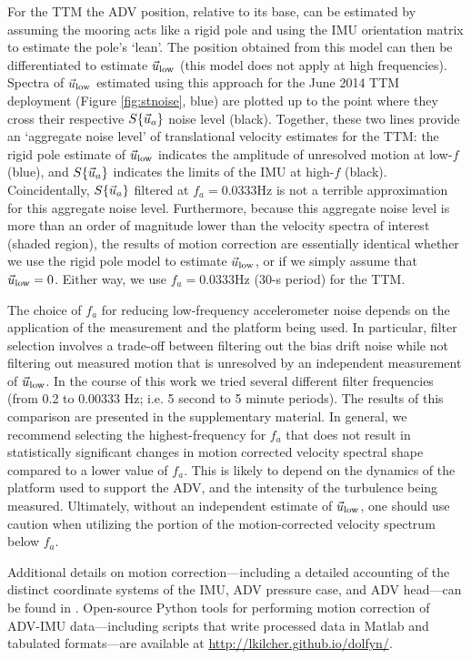 For the TTM the ADV position, relative to its base, can be estimated by assuming the mooring acts like a rigid pole and using the IMU orientation matrix to estimate the pole's `lean'. The position obtained from this model can then be differentiated to estimate $\ulow$ (this model does not apply at high frequencies). Spectra of $\ulow$ estimated using this approach for the June 2014 TTM deployment (Figure \ref{fig:stnoise}, blue) are plotted up to the point where they cross their respective $\spec{\uacc}$ noise level (black).  Together, these two lines provide an `aggregate noise level' of translational velocity estimates for the TTM: the rigid pole estimate of $\ulow$ indicates the amplitude of unresolved motion at low-$f$ (blue), and $\spec{\uacc}$ indicates the limits of the IMU at high-$f$ (black). Coincidentally, $\spec{\uacc}$ filtered at $f_a = 0.0333$Hz is not a terrible approximation for this aggregate noise level. Furthermore, because this aggregate noise level is more than an order of magnitude lower than the velocity spectra of interest (shaded region), the results of motion correction are essentially identical whether we use the rigid pole model to estimate $\ulow$, or if we simply assume that $\ulow = 0$. Either way, we use $f_a = 0.0333$Hz (30-s period) for the TTM.

The choice of $f_a$ for reducing low-frequency accelerometer noise depends on the application of the measurement and the platform being used. In particular, filter selection involves a trade-off between filtering out the bias drift noise while not filtering out measured motion that is unresolved by an independent measurement of $\ulow$. In the course of this work we tried several different filter frequencies (from 0.2 to 0.00333 Hz; i.e. 5 second to 5 minute periods). The results of this comparison are presented in the supplementary material. In general, we recommend selecting the highest-frequency for $f_a$ that does not result in statistically significant changes in motion corrected velocity spectral shape compared to a lower value of $f_a$. This is likely to depend on the dynamics of the platform used to support the ADV, and the intensity of the turbulence being measured. Ultimately, without an independent estimate of $\ulow$, one should use caution when utilizing the portion of the motion-corrected velocity spectrum below $f_a$.

Additional details on motion correction---including a detailed accounting of the distinct coordinate systems of the IMU, ADV pressure case, and ADV head---can be found in \cite{Kilcher++2016}. Open-source Python tools for performing motion correction of ADV-IMU data---including scripts that write processed data in Matlab and tabulated formats---are available at \url{http://lkilcher.github.io/dolfyn/}.

\def\ue{\ensuremath{\vec{u}\earth}}

